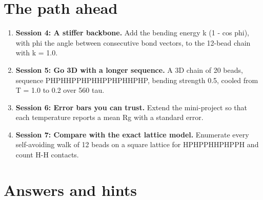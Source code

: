 \documentclass[11pt,a4paper]{article}
\begin{document}
\section{The path ahead}
\begin{enumerate}[nosep]
\item \textbf{Session 4: A stiffer backbone.} Add the bending energy k (1 - cos phi), with phi the angle between consecutive bond vectors, to the 12-bead chain with k = 1.0.
\item \textbf{Session 5: Go 3D with a longer sequence.} A 3D chain of 20 beads, sequence PHPHHPPHPHHPPHPHHPHP, bending strength 0.5, cooled from T = 1.0 to 0.2 over 560 tau.
\item \textbf{Session 6: Error bars you can trust.} Extend the mini-project so that each temperature reports a mean Rg with a standard error.
\item \textbf{Session 7: Compare with the exact lattice model.} Enumerate every self-avoiding walk of 12 beads on a square lattice for HPHPPHHPHPPH and count H-H contacts.
\end{enumerate}

\section{Answers and hints}
\end{document}
